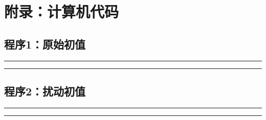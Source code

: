 \documentclass[12pt,a4paper]{article}
\begin{document}
\newpage
\section{附录：计算机代码}

\small
\subsection*{程序1：原始初值}
\hrule

\vspace{0.5cm}
\hrule

\subsection*{程序2：扰动初值}
\hrule

\hrule
\end{document}
